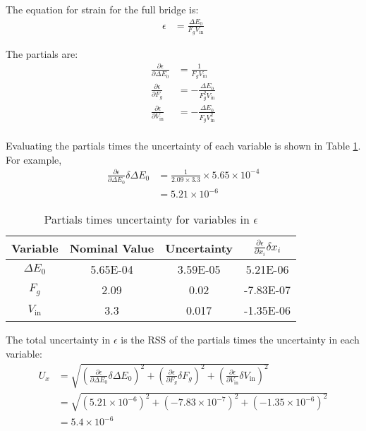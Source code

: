 \section{}

The equation for strain for the full bridge is:
\begin{align*}
    \epsilon &= \frac{\Delta E_0}{F_g V_{\text{in}}} 
\end{align*}

The partials are:
\begin{align*}
    \frac{\partial \epsilon}{\partial \Delta E_0} &= \frac{1}{F_g V_{\text{in}}} \\
    \frac{\partial \epsilon}{\partial F_g} &= -\frac{\Delta E_0}{F_g^2 V_{\text{in}}} \\
    \frac{\partial \epsilon}{\partial V_{\text{in}}} &= -\frac{\Delta E_0}{F_g V_{\text{in}}^2} \\
\end{align*}

Evaluating the partials times the uncertainty of each variable is shown in Table \ref{tab:Q7UncertaintyEpsilon}. For example,
\begin{align*}
    \frac{\partial \epsilon}{\partial \Delta E_0} \delta \Delta E_0 &=  \frac{1}{2.09 \times 3.3} \times 5.65 \times 10^{-4} \\
    & = 5.21\times 10^{-6}
\end{align*}
\begin{table}[h]
    \centering
    \caption{Partials times uncertainty for variables in $\epsilon$}
    \label{tab:Q7UncertaintyEpsilon}
    \begin{tabular}{cccc}
        \toprule
        Variable & Nominal Value & Uncertainty & $\frac{\partial \epsilon}{\partial x_i} \delta x_i$ \\
        \midrule
        $\Delta E_0$ & 5.65E-04 & 3.59E-05 & 5.21E-06 \\
        $F_g$ & 2.09 & 0.02 & -7.83E-07 \\
        $V_{\text{in}}$ & 3.3 & 0.017 & -1.35E-06 \\
        \bottomrule
    \end{tabular}
\end{table}

The total uncertainty in $\epsilon$ is the RSS of the partials times the uncertainty in each variable:
\begin{align*}
    U_{x} &= \sqrt{\left(\frac{\partial \epsilon}{\partial \Delta E_0} \delta \Delta E_0\right)^2 + \left(\frac{\partial \epsilon}{\partial F_g} \delta F_g\right)^2 + 
    \left(\frac{\partial \epsilon}{\partial V_{\text{in}}} \delta V_{\text{in}}\right)^2} \\
    &= \sqrt{(5.21\times 10^{-6})^2 + (-7.83\times 10^{-7})^2 + (-1.35\times 10^{-6})^2} \\
    &= \boxed{5.4 \times 10^{-6}}
\end{align*}